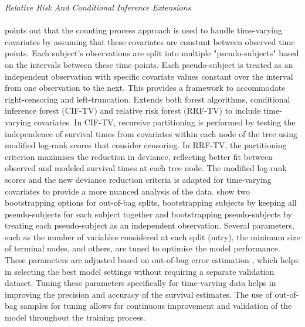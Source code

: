 \noindent \textit{Relative Risk And Conditional Inference Extensions}
\\\\
\noindent \parencite{yao_ensemble_2022} points out that the counting process approach is used to handle time-varying covariates by assuming that these covariates are constant between observed time points. Each subject's observations are split into multiple "pseudo-subjects" based on the intervals between these time points. Each pseudo-subject is treated as an independent observation with specific covariate values constant over the interval from one observation to the next. This provides a framework to accommodate right-censoring and left-truncation. \parencite{yao_ensemble_2022} Extends both forest algorithms, conditional inference forest (CIF-TV) and relative risk forest (RRF-TV) to include time-varying covariates. In CIF-TV, recursive partitioning is performed by testing the independence of survival times from covariates within each node of the tree using modified log-rank scores that consider censoring. In RRF-TV, the partitioning criterion maximises the reduction in deviance, reflecting better fit between observed and modeled survival times at each tree node. The modified log-rank scores and the new deviance reduction criteria is adapted for time-varying covariates to provide a more nuanced analysis of the data. \parencite{yao_ensemble_2022} show two bootstrapping options for out-of-bag splits, bootstrapping subjects by keeping all pseudo-subjects for each subject together and bootstrapping pseudo-subjects by treating each pseudo-subject as an independent observation. Several parameters, such as the number of variables considered at each split (mtry), the minimum size of terminal nodes, and others, are tuned to optimise the model performance. These parameters are adjusted based on out-of-bag error estimation \parencite{yao_ensemble_2022}, which helps in selecting the best model settings without requiring a separate validation dataset. Tuning these parameters specifically for time-varying data helps in improving the precision and accuracy of the survival estimates. The use of out-of-bag samples for tuning allows for continuous improvement and validation of the model throughout the training process.

